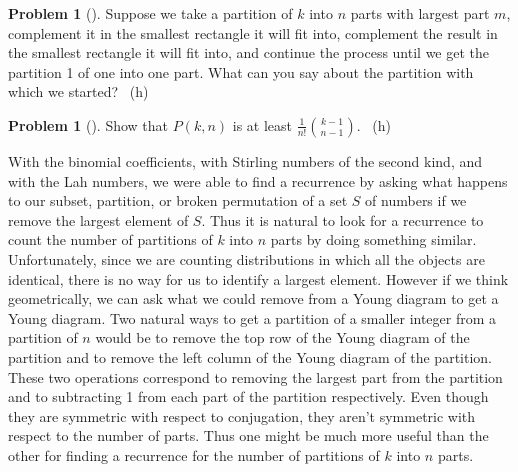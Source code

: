 \documentclass[10pt,]{book}
\theoremstyle{plain}
\theoremstyle{definition}
\newtheorem{activity}[project]{Problem}
\theoremstyle{definition}
\numberwithin{equation}{chapter}
\newcommand{\importantarrow}{\Rightarrow}
\begin{document}
\begin{activity}[]\marginsymbol[-1em]{\pdftooltip{$\importantarrow$}{especially interesting}} \label{activity-169}
\hypertarget{p-939}{}%
Suppose we take a partition of \(k\) into \(n\) parts with largest part \(m\), complement it in the smallest rectangle it will fit into, complement the result in the smallest rectangle it will fit into, and continue the process until we get the partition 1 of one into one part.  What can you say about the partition with which we started?%
~{\tiny (h)}\end{activity}
\begin{activity}[]\marginsymbol[-1em]{} \label{activity-170}
\hypertarget{p-946}{}%
Show that \(P(k,n)\) is at least \(\frac{1}{n!}\binom{k-1}{n-1}\).%
~{\tiny (h)}\end{activity}
\hypertarget{p-949}{}%
With the binomial coefficients, with Stirling numbers of the second kind, and with the Lah numbers, we were able to find a recurrence by asking what happens to our subset, partition, or broken permutation of a set \(S\) of numbers if we remove the largest element of \(S\). Thus it is natural to look for a recurrence to count the number of partitions of \(k\) into \(n\) parts by doing something similar. Unfortunately, since we are counting distributions in which all the objects are identical, there is no way for us to identify a largest element. However if we think geometrically, we can ask what we could remove from a Young diagram to get a Young diagram. Two natural ways to get a partition of a smaller integer from a partition of \(n\) would be to remove the top row of the Young diagram of the partition and to remove the left column of the Young diagram of the partition. These two operations correspond to removing the largest part from the partition and to subtracting 1 from each part of the partition respectively. Even though they are symmetric with respect to conjugation, they aren't symmetric with respect to the number of parts. Thus one might be much more useful than the other for finding a recurrence for the number of partitions of \(k\) into \(n\) parts.%
\end{document}
